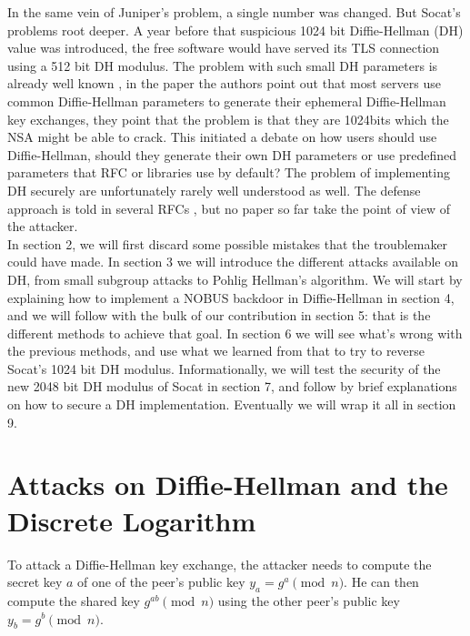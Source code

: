 \documentclass[a4paper,11pt,twocolumn]{article}
\begin{document}
In the same vein of Juniper's problem, a single number was changed. But Socat's problems root deeper. A year before that suspicious 1024 bit Diffie-Hellman (DH) value was introduced, the free software would have served its TLS connection using a 512 bit DH modulus. The problem with such small DH parameters is already well known \cite{logjam}, in the paper the authors point out that most servers use common Diffie-Hellman parameters to generate their ephemeral Diffie-Hellman key exchanges, they point that the problem is that they are 1024bits which the NSA might be able to crack. This initiated a debate on how users should use Diffie-Hellman, should they generate their own DH parameters or use predefined parameters that RFC  or libraries use by default? The problem of implementing DH securely are unfortunately rarely well understood as well. The defense approach is told in several RFCs \cite{rfc2631} \cite{rfc2785}, but no paper so far take the point of view of the attacker.\\

In section 2, we will first discard some possible mistakes that the troublemaker could have made. In section 3 we will introduce the different attacks available on DH, from small subgroup attacks to Pohlig Hellman's algorithm. We will start by explaining how to implement a NOBUS backdoor in Diffie-Hellman in section 4, and we will follow with the bulk of our contribution in section 5: that is the different methods to achieve that goal. In section 6 we will see what's wrong with the previous methods, and use what we learned from that to try to reverse Socat's 1024 bit DH modulus. Informationally, we will test the security of the new 2048 bit DH modulus of Socat in section 7, and follow by brief explanations on how to secure a DH implementation. Eventually we will wrap it all in section 9.

\section{Attacks on Diffie-Hellman and the Discrete Logarithm}

To attack a Diffie-Hellman key exchange, the attacker needs to compute the secret key $a$ of one of the peer's public key $y_a = g^a \pmod{n}$. He can then compute the shared key $g^{ab} \pmod{n}$ using the other peer's public key $y_b = g^b \pmod{n}$.\\
\end{document}

